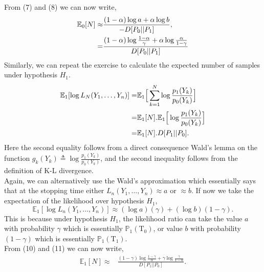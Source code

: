 \documentclass[a4paper,english,12pt]{article}
\newcommand{\Tau}{\mathrm{T}}
\begin{document}
From (7) and (8) we can now write,
\begin{eqnarray}
\notag\mathbb{E}_0[N] \approx & \frac{(1-\alpha)\log a + \alpha\log b}{-D[P_0||P_1]},\\
=& \frac{(1-\alpha)\log \frac{1-\alpha}{\gamma} + \alpha\log \frac{\alpha}{1-\gamma}}{D[P_0||P_1]}
\end{eqnarray}
Similarly, we can repeat the exercise to calculate the expected number of samples under hypothesis $H_1$.
\begin{eqnarray}
\notag\mathbb{E}_1[\log L_N(Y_1,\ldots, Y_n)] = & \mathbb{E}_1\Big[\sum_{k=1}^{N}\log \frac{p_1(Y_k)}{p_0(Y_k)}\Big]\\
\notag=& \mathbb{E}_1[N].\mathbb{E}_1\Big[\log \frac{p_1(Y_k)}{p_0(Y_k)}\Big]\\
=& \mathbb{E}_1[N].D[P_1||P_0].
\end{eqnarray}
Here the second equality follows from a direct consequence Wald's lemma on the function $g_k(Y_k)\triangleq \log\frac{p_1(Y_k)}{p_0(Y_k)}$, and the second inequality follows from the definition of K-L divergence.\\
Again, we can alternatively use the Wald's approximation which essentially says that at the stopping time either $L_n(Y_1,\ldots,Y_n) \approx a \text{ or } \approx b$. If now  we take the expectation of the likelihood over hypothesis $H_1$,
\begin{equation}
\mathbb{E}_1[\log L_n(Y_1,\ldots,Y_n)] \approx (\log a)(\gamma) + (\log b)(1-\gamma).
\end{equation}
This is because under hypothesis $H_1$, the likelihood ratio can take the  value $a$ with probability $\gamma$ which is essentially $\mathbb{P}_1(\Tau_0)$, or value $b$ with probability $(1-\gamma)$ which is essentially $\mathbb{P}_1(\Tau_1)$.\\
From (10) and (11) we can now write,
\begin{eqnarray}
\mathbb{E}_1[N] \approx & \frac{(1-\gamma)\log \frac{1-\gamma}{\alpha} + \gamma\log \frac{\gamma}{1-\alpha}}{D[P_1||P_0]}.
\end{eqnarray}
\end{document}
